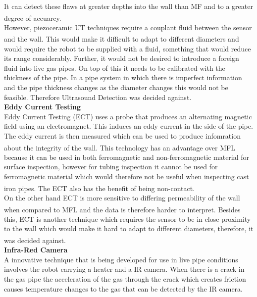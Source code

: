 \documentclass[11pt]{article}		%
\newcommand{\supercite}[1]{\textsuperscript{\cite{#1}}}		%
\begin{document}
	        It can detect these flaws at greater depths into the wall than MF and to a greater degree of accuarcy.\supercite{MFL_Pig} 
	        \\
	        However, piezoceramic UT techniques require a couplant fluid between the sensor and the wall. \supercite{UT_explanation}
	        This would make it difficult to adapt to different diameters and would require the robot to be supplied with a fluid, something that would reduce its range considerably.
	        Further, it would not be desired to introduce a foreign fluid into live gas pipes. 
	        On top of this it needs to be calibrated with the thickness of the pipe. 
	        In a pipe system in which there is imperfect information and the pipe thickness changes as the diameter changes this would not be feasible. 
	        Therefore Ultrasound Detection was decided against.
	        \\
	        \textbf{Eddy Current Testing}
	        \\
	        Eddy Current Testing (ECT) uses a probe that produces an alternating magnetic field using an electromagnet.
	        This induces an eddy current in the side of the pipe. 
	        The eddy current is then measured which can be used to produce infomration about the integrity of the wall.\supercite{ECT}
	        This technology has an advantage over MFL because it can be used in both ferromagnetic and non-ferromagnetic material for surface inspection, however for tubing inspection it cannot be used for ferromagnetic material which would therefore not be useful when inspecting cast iron pipes.
	        The ECT  also has the benefit of being non-contact.\supercite{Corrosion}
	        \\
	        On the other hand ECT is more sensitive to differing permeability of the wall when compared to MFL and the data is therefore harder to interpret.\supercite{MFL_explanation} %
	        Besides this, ECT is another technique which requires the sensor to be in close proximity to the wall which would make it hard to adapt to different diameters, therefore, it was decided against.\supercite{ECT}
	        \\
	        \textbf{Infra-Red Camera}
	        \\
	        A innovative technique that is being developed for use in live pipe conditions involves the robot carrying a heater and a IR camera. 
	        When there is a crack in the gas pipe the acceleration of the gas through the crack which creates friction causes temperature changes to the gas that can be detected by the IR camera. 
\end{document}
